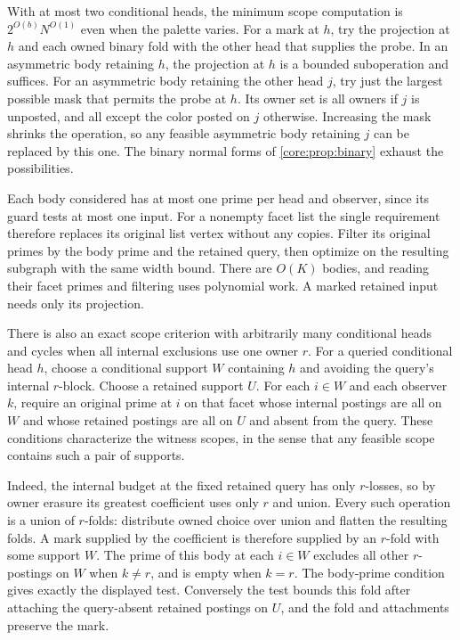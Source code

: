 With at most two conditional heads, the minimum
scope computation is $2^{O(b)}N^{O(1)}$ even
when the palette varies. For a mark at $h$,
try the projection at $h$ and each owned
binary fold with the other head that supplies
the probe. In an asymmetric body retaining $h$,
the projection at $h$ is a bounded suboperation
and suffices. For an asymmetric body retaining
the other head $j$, try just the largest possible
mask that permits the probe at $h$. Its owner
set is all owners if $j$ is unposted, and all
except the color posted on $j$ otherwise.
Increasing the mask shrinks the operation,
so any feasible asymmetric body retaining $j$
can be replaced by this one. The binary normal
forms of \cref{core:prop:binary} exhaust the
possibilities.

Each body considered has at most one prime per
head and observer, since its guard tests at
most one input. For a nonempty facet list the
single requirement therefore replaces its
original list vertex without any copies.
Filter its original primes by the body prime
and the retained query, then optimize on the
resulting subgraph with the same width bound.
There are $O(K)$ bodies, and reading their
facet primes and filtering uses polynomial
work. A marked retained input needs only its
projection.

There is also an exact scope criterion with
arbitrarily many conditional heads and cycles
when all internal exclusions use one owner $r$.
For a queried conditional head $h$, choose a
conditional support $W$ containing $h$ and
avoiding the query's internal $r$-block. Choose
a retained support $U$. For each $i\in W$ and
each observer $k$, require an original prime
at $i$ on that facet whose internal postings
are all on $W$ and whose retained postings
are all on $U$ and absent from the query.
These conditions characterize the witness
scopes, in the sense that any feasible scope
contains such a pair of supports.

Indeed, the internal budget at the fixed
retained query has only $r$-losses, so by owner
erasure its greatest coefficient uses only
$r$ and union. Every such operation is a union
of $r$-folds: distribute owned choice over
union and flatten the resulting folds.
A mark supplied by the coefficient is therefore
supplied by an $r$-fold with some support $W$.
The prime of this body at each $i\in W$
excludes all other $r$-postings on $W$ when
$k\ne r$, and is empty when $k=r$.
The body-prime condition gives exactly the
displayed test. Conversely the test bounds
this fold after attaching the query-absent
retained postings on $U$, and the fold and
attachments preserve the mark.

